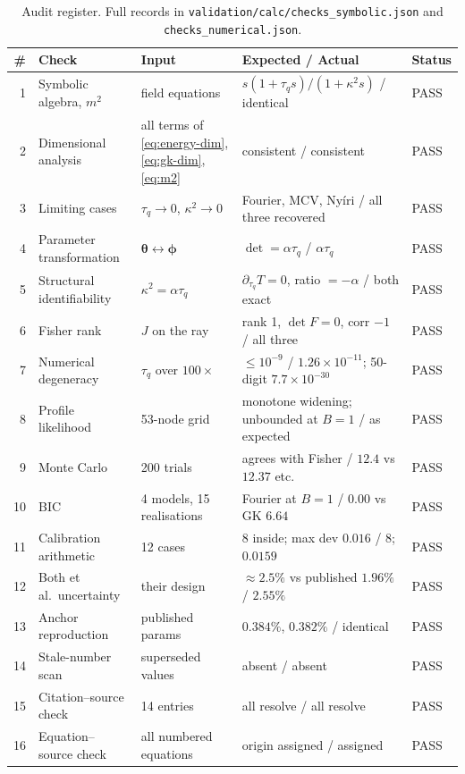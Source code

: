 \documentclass[11pt,a4paper]{article}
\theoremstyle{definition}
\newcommand{\tq}{\tau_{q}}
\newcommand{\kk}{\kappa^{2}}
\newcommand{\Bnum}{B}
\begin{document}
\begin{table}[H]
\centering
\caption{Audit register. Full records in
         \texttt{validation/calc/checks\_symbolic.json} and
         \texttt{checks\_numerical.json}.}
\label{tab:audit}
\scriptsize
\begin{tabularx}{\textwidth}{@{}rp{3.1cm}p{3.5cm}Xl@{}}
\toprule
\# & Check & Input & Expected / Actual & Status \\
\midrule
1 & Symbolic algebra, $m^{2}$ & field equations & $s(1+\tq s)/(1+\kk s)$ /
  identical & PASS \\
2 & Dimensional analysis & all terms of
  \eqref{eq:energy-dim},\eqref{eq:gk-dim},\eqref{eq:m2} & consistent /
  consistent & PASS \\
3 & Limiting cases & $\tq\to0$, $\kk\to0$ & Fourier, MCV, Nyíri / all three
  recovered & PASS \\
4 & Parameter transformation & $\bm\theta\leftrightarrow\bm\phi$ &
  $\det=\alpha\tq$ / $\alpha\tq$ & PASS \\
5 & Structural identifiability & $\kk=\alpha\tq$ &
  $\partial_{\tq}T=0$, ratio $=-\alpha$ / both exact & PASS \\
6 & Fisher rank & $J$ on the ray & rank 1, $\det F=0$, corr $-1$ / all three
  & PASS \\
7 & Numerical degeneracy & $\tq$ over $100\times$ &
  $\leq10^{-9}$ / $1.26\times10^{-11}$; 50-digit $7.7\times10^{-30}$ &
  PASS \\
8 & Profile likelihood & 53-node grid & monotone widening; unbounded at
  $\Bnum=1$ / as expected & PASS \\
9 & Monte Carlo & 200 trials & agrees with Fisher / $12.4$ vs $12.37$ etc.
  & PASS \\
10 & BIC & 4 models, 15 realisations & Fourier at $\Bnum=1$ /
  $0.00$ vs GK $6.64$ & PASS \\
11 & Calibration arithmetic & 12 cases & 8 inside; max dev $0.016$ /
  8; $0.0159$ & PASS \\
12 & Both et al.\ uncertainty & their design & $\approx2.5\%$ vs published
  $1.96\%$ / $2.55\%$ & PASS \\
13 & Anchor reproduction & published params & $0.384\%$, $0.382\%$ /
  identical & PASS \\
14 & Stale-number scan & superseded values & absent / absent & PASS \\
15 & Citation--source check & 14 entries & all resolve / all resolve &
  PASS \\
16 & Equation--source check & all numbered equations & origin assigned /
  assigned & PASS \\
\bottomrule
\end{tabularx}
\end{table}
\end{document}
